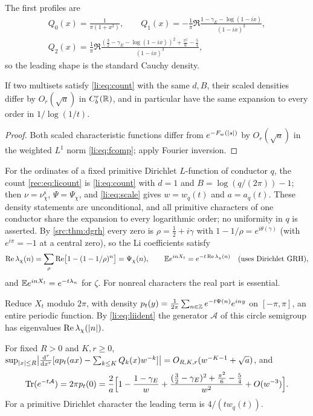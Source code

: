 The first profiles are
\begin{gather*}
 Q_0(x)=\frac1{\pi(1+x^2)},\qquad Q_1(x)=-\frac1\pi\Re\frac{1-\gamma_E-\log(1-ix)}{(1-ix)^2},\\
 Q_2(x)=\frac1\pi\Re\frac{(\frac32-\gamma_E-\log(1-ix))^2+\frac{\pi^2}6-\frac54}{(1-ix)^3},
\end{gather*}
so the leading shape is the standard Cauchy density.

\begin{corollary}\label{li:cor:universal}
If two multisets satisfy \eqref{li:eq:count} with the same $d,B$, their scaled densities differ by
$O_r(\sqrt a)$ in $C_b^r(\mathbb{R})$, and in particular have the same expansion to every order in
$1/\log(1/t)$.
\end{corollary}

\begin{proof}
Both scaled characteristic functions differ from $e^{-F_w(\lvert s\rvert)}$ by $O_r(\sqrt a)$ in the weighted
$L^1$ norm \eqref{li:eq:fcomp}; apply Fourier inversion.
\end{proof}

For the ordinates of a fixed primitive Dirichlet $L$-function of conductor $q$, the count
\eqref{rec:eq:licount} is \eqref{li:eq:count} with $d=1$ and $B=\log(q/(2\pi))-1$; then
$\nu=\nu^{\mathrm s}_\chi$, $\Psi=\Psi_\chi$, and \eqref{li:eq:scale} gives $w=w_q(t)$ and
$a=a_q(t)$. These density statements are unconditional, and all primitive characters of one conductor share the
expansion to every logarithmic order; no uniformity in $q$ is asserted. By \cref{src:thm:dgrh}
every zero is $\rho=\frac12+i\gamma$ with $1-1/\rho=e^{i\theta(\gamma)}$ (with $e^{i\pi}=-1$ at a central zero),
so the Li coefficients satisfy
\begin{equation}\label{li:eq:liident}
 \operatorname{Re}\lambda_\chi(n)=\sum_\rho\operatorname{Re}\bigl[1-(1-1/\rho)^n\bigr]=\Psi_\chi(n),\qquad
 \mathbb{E} e^{inX_t}=e^{-t\operatorname{Re}\lambda_\chi(n)}\quad(\text{uses Dirichlet GRH}),
\end{equation}
and $\mathbb{E} e^{inX_t}=e^{-t\lambda_n}$ for $\zeta$. For nonreal characters the real part is essential.

Reduce $X_t$ modulo $2\pi$, with density $p_t(y)=\frac1{2\pi}\sum_{n\in\mathbb{Z}}e^{-t\Psi(n)}e^{iny}$ on
$[-\pi,\pi]$, an entire periodic function. By \eqref{li:eq:liident} the generator $\mathcal A$ of this
circle semigroup has eigenvalues $\operatorname{Re}\lambda_\chi(\lvert n\rvert)$.

\begin{proposition}\label{li:prop:trace}
For fixed $R>0$ and $K,r\ge0$,
$\sup_{\lvert x\rvert\le R}\bigl|\frac{\mathrm{d}^r}{\mathrm{d} x^r}[ap_t(ax)-\sum_{k\le K}Q_k(x)w^{-k}]\bigr|=O_{R,K,r}(w^{-K-1}+\sqrt a)$,
and
\[
 \operatorname{Tr}(e^{-t\mathcal A})=2\pi p_t(0)=\frac2a\Bigl[1-\frac{1-\gamma_E}w+\frac{(\frac32-\gamma_E)^2+\frac{\pi^2}6-\frac54}{w^2}
 +O(w^{-3})\Bigr].
\]
For a primitive Dirichlet character the leading term is $4/(tw_q(t))$.
\end{proposition}

